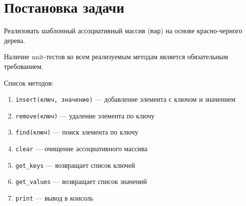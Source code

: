 \section{Постановка задачи}

Реализовать шаблонный ассоциативный массив (\verb|map|) 
на основе красно-черного дерева. 

Наличие unit-тестов ко всем реализуемым методам является
обязательным требованием.

Список методов:

\begin{enumerate}
    \item \verb|insert(ключ, значение)| --- добавление элемента с ключом и значением
    \item \verb|remove(ключ)| --- удаление элемента по ключу
    \item \verb|find(ключ)| --- поиск элемента по ключу
    \item \verb|clear| --- очищение ассоциативного массива
    \item \verb|get_keys| --- возвращает список ключей
    \item \verb|get_values| --- возвращает список значений
    \item \verb|print| --- вывод в консоль
\end{enumerate}